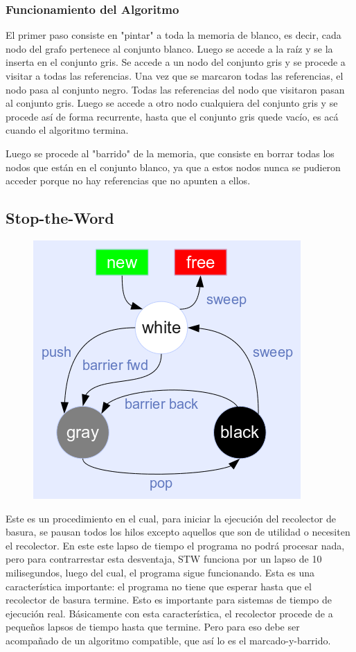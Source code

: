 \documentclass{article}
\begin{document}
\subsubsection{Funcionamiento del Algoritmo}

El primer paso consiste en "pintar" a toda la memoria de blanco, es decir, cada nodo del grafo pertenece al conjunto blanco. Luego se accede a la raíz y se la inserta en el conjunto gris. 
Se accede a un nodo del conjunto gris y se procede a visitar a todas las referencias. Una vez que se marcaron todas las referencias, el nodo pasa al conjunto negro. Todas las referencias del nodo que visitaron pasan al conjunto gris. Luego se accede a otro nodo cualquiera del conjunto gris y se procede así de forma recurrente, hasta que el conjunto gris quede vacío, es acá cuando el algoritmo termina.

Luego se procede al "barrido" de la memoria, que consiste en borrar todas los nodos que están en el conjunto blanco, ya que a estos nodos nunca se pudieron acceder porque no hay referencias que no apunten a ellos.


\subsection{Stop-the-Word}

\begin{figure}
\centering
\includegraphics[width=0.4\linewidth]{./gc_color3}
\label{fig:gc_color3}
\end{figure}


Este es un procedimiento en el cual, para iniciar la ejecución del recolector de basura, se pausan todos los hilos excepto aquellos que son de utilidad o necesiten el recolector. En este este lapso de tiempo el programa no podrá procesar nada, pero para contrarrestar esta desventaja, STW funciona por un lapso de 10 milisegundos, luego del cual, el programa sigue funcionando. Esta es una característica importante: el programa no tiene que esperar hasta que el recolector de basura termine. Esto es importante para sistemas de tiempo de ejecución real. Básicamente con esta característica, el recolector procede de a pequeños lapsos de tiempo hasta que termine. Pero para eso debe ser acompañado de un algoritmo compatible, que así lo es el marcado-y-barrido.
\end{document}
